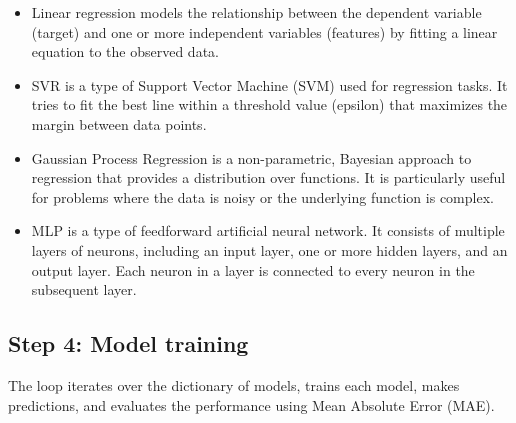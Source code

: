 \documentclass{article}
\begin{document}
\begin{itemize}
\tightlist
\item
  Linear regression models the relationship between the dependent
  variable (target) and one or more independent variables (features) by
  fitting a linear equation to the observed data.
\item
  SVR is a type of Support Vector Machine (SVM) used for regression
  tasks. It tries to fit the best line within a threshold value
  (epsilon) that maximizes the margin between data points.
\item
  Gaussian Process Regression is a non-parametric, Bayesian approach to
  regression that provides a distribution over functions. It is
  particularly useful for problems where the data is noisy or the
  underlying function is complex.
\item
  MLP is a type of feedforward artificial neural network. It consists of
  multiple layers of neurons, including an input layer, one or more
  hidden layers, and an output layer. Each neuron in a layer is
  connected to every neuron in the subsequent layer.
\end{itemize}

\begin{Shaded}
\begin{Highlighting}[]
\OperatorTok{=}\NormalTok{ \{}
    \OperatorTok{=}\NormalTok{(}\NormalTok{, }\OperatorTok{=}\NormalTok{)}
\NormalTok{\}}
\end{Highlighting}
\end{Shaded}

\subsection{Step 4: Model training}\label{step-4-model-training}

The loop iterates over the dictionary of models, trains each model,
makes predictions, and evaluates the performance using Mean Absolute
Error (MAE).
\end{document}
